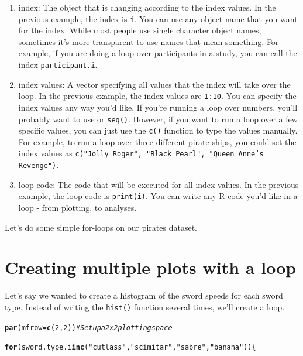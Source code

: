 \documentclass{tufte-book}\usepackage[]{graphicx}\usepackage[]{color}
\makeatletter
\newcommand{\hlnum}[1]{\textcolor[rgb]{0.686,0.059,0.569}{#1}}%
\newcommand{\hlstr}[1]{\textcolor[rgb]{0.192,0.494,0.8}{#1}}%
\newcommand{\hlcom}[1]{\textcolor[rgb]{0.678,0.584,0.686}{\textit{#1}}}%
\newcommand{\hlstd}[1]{\textcolor[rgb]{0.345,0.345,0.345}{#1}}%
\newcommand{\hlkwa}[1]{\textcolor[rgb]{0.161,0.373,0.58}{\textbf{#1}}}%
\newcommand{\hlkwc}[1]{\textcolor[rgb]{0.333,0.667,0.333}{#1}}%
\newcommand{\hlkwd}[1]{\textcolor[rgb]{0.737,0.353,0.396}{\textbf{#1}}}%
\newenvironment{kframe}{%
 \def\at@end@of@kframe{}%
 \ifinner\ifhmode%
  \def\at@end@of@kframe{\end{minipage}}%
  \begin{minipage}{\columnwidth}%
 \fi\fi%
 \def\FrameCommand##1{\hskip\@totalleftmargin \hskip-\fboxsep
 \colorbox{shadecolor}{##1}\hskip-\fboxsep
     \hskip-\linewidth \hskip-\@totalleftmargin \hskip\columnwidth}%
 \MakeFramed {\advance\hsize-\width
   \@totalleftmargin\z@ \linewidth\hsize
   \@setminipage}}%
 {\par\unskip\endMakeFramed%
 \at@end@of@kframe}
\newenvironment{knitrout}{}{} %
\makeatother
\begin{document}
\begin{footnotesize}
\begin{enumerate}
  \item index: The object that is changing according to the index values. In the previous example, the index is \texttt{i}. You can use any object name that you want for the index. While most people use single character object names, sometimes it's more transparent to use names that mean something. For example, if you are doing a loop over participants in a study, you can call the index \texttt{participant.i}.
  \item index values: A vector specifying all values that the index will take over the loop. In the previous example, the index values are \texttt{1:10}. You can specify the index values any way you'd like. If you're running a loop over numbers, you'll probably want to use  or \texttt{seq()}. However, if you want to run a loop over a few specific values, you can just use the \texttt{c()} function to type the values manually. For example, to run a loop over three different pirate ships, you could set the index values as \texttt{c("Jolly Roger", "Black Pearl", "Queen Anne's Revenge")}.
  \item loop code: The code that will be executed for all index values. In the previous example, the loop code is \texttt{print(i)}. You can write any R code you'd like in a loop - from plotting, to analyses.

\end{enumerate}


Let's do some simple for-loops on our pirates dataset. 

\section{Creating multiple plots with a loop}

Let's say we wanted to create a histogram of the sword speeds for each sword type. Instead of writing the \texttt{hist()} function several times, we'll create a loop.

\begin{knitrout}
\color{fgcolor}\begin{kframe}
\begin{alltt}
\hlkwd{par}\hlstd{(}\hlkwc{mfrow} \hlstd{=} \hlkwd{c}\hlstd{(}\hlnum{2}\hlstd{,} \hlnum{2}\hlstd{))}  \hlcom{# Set up a 2 x 2 plotting space}

\hlkwa{for} \hlstd{(sword.type.i} \hlkwa{in} \hlkwd{c}\hlstd{(}\hlstr{"cutlass"}\hlstd{,} \hlstr{"scimitar"}\hlstd{,} \hlstr{"sabre"}\hlstd{,} \hlstr{"banana"}\hlstd{)) \{}


\end{alltt}
\end{kframe}
\end{knitrout}
\end{footnotesize}
\end{document}
